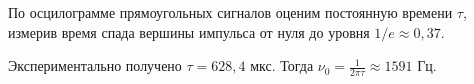 	
	По осцилограмме прямоугольных сигналов оценим постоянную времени $\tau$,\\ измерив время спада вершины импульса от нуля до уровня $1/e \approx 0,37$.
	
	Экспериментально получено $\tau = 628,4$ мкс. Тогда $\nu_0 = \frac{1}{2 \pi \tau} \approx 1591$ Гц.
	

